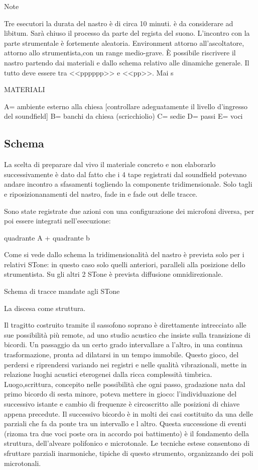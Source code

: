 Note

Tre esecutori
la durata del nastro è di circa 10 minuti.
è da considerare ad libitum. Sarà chiuso il processo da parte del regista del suono.
L'incontro con la parte strumentale è fortemente aleatoria. Environment attorno all’ascoltatore, attorno allo strumentista,con un range medio-grave. È possibile riscrivere il nastro partendo dai materiali e dallo schema relativo alle dinamiche generale. Il tutto deve essere tra <<pppppp>> e <<pp>>. Mai s

MATERIALI

A= ambiente esterno alla chiesa [controllare adeguatamente il livello d'ingresso del soundfield]
B= banchi da chiesa (scricchiolio)
C= sedie
D= passi
E= voci




\subsection{Schema}

La scelta di preparare  dal vivo il materiale  concreto e non elaborarlo successivamente
è dato dal fatto che i 4 tape registrati dal soundfield potevano andare incontro a
sfasamenti togliendo la componente tridimensionale. Solo tagli e riposizionanamenti
del nastro, fade in e fade out delle tracce.

Sono state registrate due azioni con una configurazione dei microfoni diversa,
per poi essere integrati nell'esecuzione:

quadrante A            +             quadrante b


Come si vede dallo schema la tridimensionalità del nastro è prevista solo per i relativi STone:
in questo caso solo quelli anteriori, paralleli alla posizione dello strumentista.
Su gli altri 2 STone è prevista diffusione omnidirezionale.

Schema di tracce mandate agli STone

La discesa come struttura.

Il tragitto costruito tramite il sassofono soprano è direttamente intrecciato alle sue
possibilità più remote, ad uno studio acustico che insiste sulla transizione di bicordi.
Un passaggio da un certo grado intervallare a l’altro, in una continua trasformazione,
pronta ad dilatarsi in un tempo immobile. Questo gioco, del perdersi e riprendersi
variando nei registri e nelle  qualità vibrazionali, mette in relazione luoghi
acustici eterogenei dalla ricca complessità timbrica.
Luogo,scrittura, concepito nelle possibilità che ogni passo, gradazione nata dal
primo bicordo di sesta minore, poteva mettere in gioco: l’individuazione del successivo
istante e cambio di frequenze è circoscritto alle posizioni di chiave appena precedute.
Il successivo bicordo è in molti dei casi costituito da una delle parziali che fa da
ponte tra un intervallo e l altro.
Questa successione di eventi (rizoma tra due voci poste ora in accordo poi battimento)
è il fondamento della struttura, dell’alveare polifonico e microtonale.
Le tecniche estese consentono di sfruttare parziali inarmoniche, tipiche di questo
strumento, organizzando dei poli microtonali.

